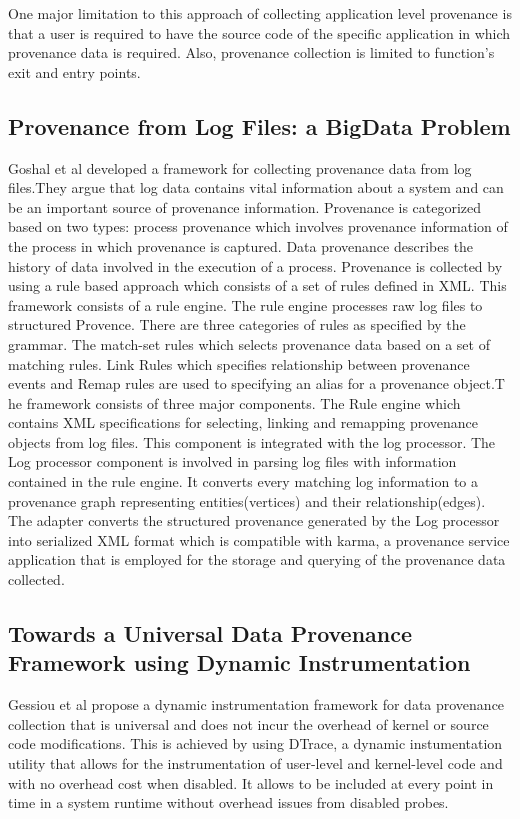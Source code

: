 One major limitation to this approach of collecting application level provenance is that a user is required to have the source code of the specific application in which provenance data is required. Also, provenance collection is limited to function's exit and entry points.


\subsection{Provenance from Log Files: a BigData Problem}


Goshal et al \cite{ghoshal_provenance_2013} developed a framework for collecting provenance data from log files.They argue that log data contains vital information about a system and can be an important source of provenance information. Provenance is categorized based on two types: process provenance which involves provenance information of the process in which provenance is captured. Data provenance describes the history of data involved in the execution of a process. Provenance is collected by using a rule based approach which consists of a set of rules defined in XML. This framework consists of a rule engine. The rule engine processes raw log files to structured Provence. There are three categories of rules as specified by the grammar. The match-set rules which selects provenance data based on a set of matching rules. Link Rules which specifies relationship between provenance events and Remap rules are used to specifying an alias for a provenance object.T he framework consists of three major components. The Rule engine which contains XML specifications for selecting, linking and remapping provenance objects from log files. This component is integrated with the log processor. The Log processor component is involved in parsing log files with information contained in the rule engine. It converts every matching log information to a provenance graph representing entities(vertices) and their relationship(edges). The adapter converts the structured provenance generated by the Log processor into serialized XML format which is compatible with karma, a provenance service application that is employed for the storage and querying of the provenance data collected.




\subsection{Towards a Universal Data Provenance Framework using Dynamic Instrumentation}
Gessiou et al propose a dynamic instrumentation framework for data provenance collection that is universal and does not incur the overhead of kernel or source code modifications. This is achieved by using DTrace, a dynamic instumentation utility that allows for the instrumentation of user-level and kernel-level code and with no overhead cost when disabled. It allows to be included at every point in time in a system  runtime without overhead issues from disabled probes.

